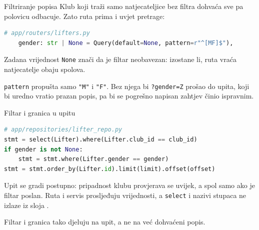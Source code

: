 \begin{frame}[fragile]{Filtriranje popisa}
Klub koji traži samo natjecateljice bez filtra dohvaća sve pa polovicu odbacuje. Zato ruta prima i uvjet pretrage:

\begin{lstlisting}[language=python]
# app/routers/lifters.py
    gender: str | None = Query(default=None, pattern=r"^[MF]$"),
\end{lstlisting}

\vspace{0.6em}
Zadana vrijednost \texttt{None} znači da je filtar neobavezan: izostane li, ruta vraća natjecatelje obaju spolova.

\vspace{0.9em}
\texttt{pattern} propušta samo \texttt{"M"} i \texttt{"F"}. Bez njega bi \texttt{?gender=Z} prošao do upita, koji bi uredno vratio prazan popis, pa bi se pogrešno napisan zahtjev činio ispravnim.
\end{frame}

\begin{frame}[fragile]{Filtar i granica u upitu}
\begin{lstlisting}[language=python]
# app/repositories/lifter_repo.py
stmt = select(Lifter).where(Lifter.club_id == club_id)
if gender is not None:
    stmt = stmt.where(Lifter.gender == gender)
stmt = stmt.order_by(Lifter.id).limit(limit).offset(offset)
\end{lstlisting}

\vspace{0.3em}
Upit se gradi postupno: pripadnost klubu provjerava se uvijek, a spol samo ako je filtar poslan. Ruta i servis prosljeđuju vrijednosti, a \texttt{select} i nazivi stupaca ne izlaze iz sloja .

\vspace{0.3em}
Filtar i granica tako djeluju na upit, a ne na već dohvaćeni popis.
\end{frame}

